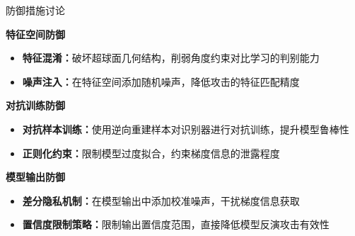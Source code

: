 \documentclass[aspectratio=169,12pt]{beamer}
\renewcommand{\textbf}[1]{\textcolor{hitblue}{\bfseries #1}}
\begin{document}
\begin{frame}{防御措施讨论}

\textbf{特征空间防御}
\begin{itemize}
\item \textbf{特征混淆：}破坏超球面几何结构，削弱角度约束对比学习的判别能力
\item \textbf{噪声注入：}在特征空间添加随机噪声，降低攻击的特征匹配精度
\end{itemize}

\vspace{0.4em}

\textbf{对抗训练防御}
\begin{itemize}
\item \textbf{对抗样本训练：}使用逆向重建样本对识别器进行对抗训练，提升模型鲁棒性
\item \textbf{正则化约束：}限制模型过度拟合，约束梯度信息的泄露程度
\end{itemize}

\vspace{0.4em}

\textbf{模型输出防御}
\begin{itemize}
\item \textbf{差分隐私机制：}在模型输出中添加校准噪声，干扰梯度信息获取
\item \textbf{置信度限制策略：}限制输出置信度范围，直接降低模型反演攻击有效性
\end{itemize}

\end{frame} %
\end{document}
